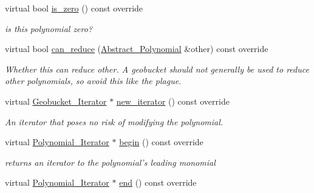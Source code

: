 \begin{Indent}
\begin{DoxyCompactItemize}
virtual bool \hyperlink{group__polygroup_ac71d7f640ebdf764c5b81bf8d9a5686d}{is\+\_\+zero} () const override
\begin{DoxyCompactList}\small\item\em is this polynomial zero? \end{DoxyCompactList}\item 
\mbox{\label{group__polygroup_af6fc5e1931972bd9e5f296ca719a1815}} 
virtual bool \hyperlink{group__polygroup_af6fc5e1931972bd9e5f296ca719a1815}{can\+\_\+reduce} (\hyperlink{group__polygroup_class_abstract___polynomial}{Abstract\+\_\+\+Polynomial} \&other) const override
\begin{DoxyCompactList}\small\item\em Whether {\ttfamily this} can reduce {\ttfamily other}. A geobucket should not generally be used to reduce other polynomials, so avoid this like the plague. \end{DoxyCompactList}\item 
\mbox{\label{group__polygroup_a08a6bd3fd143c05e1b2762a7f239b371}} 
virtual \hyperlink{group___iterator_group_class_geobucket___iterator}{Geobucket\+\_\+\+Iterator} $\ast$ \hyperlink{group__polygroup_a08a6bd3fd143c05e1b2762a7f239b371}{new\+\_\+iterator} () const override
\begin{DoxyCompactList}\small\item\em An iterator that poses no risk of modifying the polynomial. \end{DoxyCompactList}\item 
\mbox{\label{group__polygroup_a0c5f05f041e6d2c462d1dcb2bdd39df0}} 
virtual \hyperlink{group___iterator_group_class_polynomial___iterator}{Polynomial\+\_\+\+Iterator} $\ast$ \hyperlink{group__polygroup_a0c5f05f041e6d2c462d1dcb2bdd39df0}{begin} () const override
\begin{DoxyCompactList}\small\item\em returns an iterator to the polynomial's leading monomial \end{DoxyCompactList}\item 
\mbox{\label{group__polygroup_a28dde5c7941ad0636f17054cd80bbd8e}} 
virtual \hyperlink{group___iterator_group_class_polynomial___iterator}{Polynomial\+\_\+\+Iterator} $\ast$ \hyperlink{group__polygroup_a28dde5c7941ad0636f17054cd80bbd8e}{end} () const override

\end{DoxyCompactItemize}
\end{Indent}
